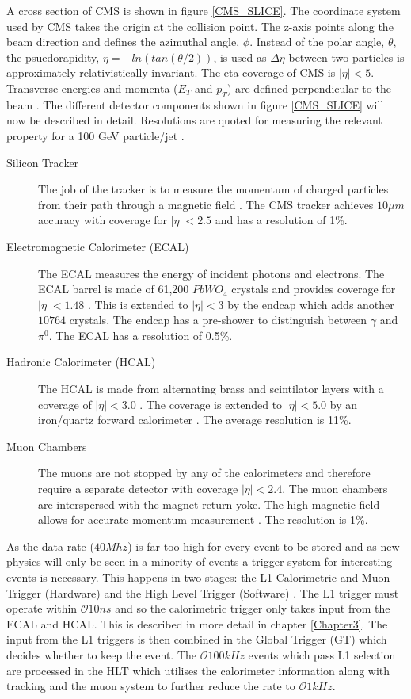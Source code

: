 A cross section of CMS is shown in figure \ref{CMS_SLICE}. The coordinate system used by CMS takes the origin at the collision point. The z-axis points along the beam direction and defines the azimuthal angle, $\phi$. Instead of the polar angle, $\theta$, the psuedorapidity, $\eta=-ln(tan(\theta/2))$, is used as $\Delta \eta$ between two particles is approximately relativistically invariant. The eta coverage of CMS is $|\eta|<5$. Transverse energies and momenta ($E_T $ and $p_T$)  are defined perpendicular to the beam \cite{cmsiop}. The different detector components shown in figure \ref{CMS_SLICE} will now be described in detail. Resolutions are quoted for measuring the relevant property for a 100 GeV particle/jet \cite{SACharacteristics}.
\begin{description}
\item[Silicon Tracker]The job of the tracker is to measure the momentum of charged particles from their path through a magnetic field \cite{siliconTDR}. The CMS tracker achieves $10\mu m$ accuracy with coverage for $|\eta|<2.5$ and has a resolution of 1\%.
\item[Electromagnetic Calorimeter (ECAL)] The ECAL measures the energy of incident photons and electrons. The ECAL barrel is made of 61,200 $PbWO_4$ crystals and provides coverage for $|\eta|<1.48$ \cite{ecal}. This is extended to $|\eta|<3$ by the endcap which adds another $10764$ crystals. The endcap has a pre-shower to distinguish between $\gamma$ and $\pi^0$. The ECAL has a resolution of 0.5\%.
 \item[Hadronic Calorimeter (HCAL)] The HCAL is made from alternating brass and scintilator layers with a coverage of $|\eta|<3.0$ \cite{hcal}. The coverage is extended to  $|\eta|<5.0$ by an iron/quartz forward calorimeter \cite{hfhcal}. The average resolution is 11\%. 
 \item[Muon Chambers]The muons are not stopped by any of the calorimeters and therefore require a separate detector with coverage $|\eta| < 2.4$. The muon chambers are interspersed with the magnet return yoke. The high magnetic field allows for accurate momentum measurement \cite{muons}. The resolution is 1\%.
\end{description}
As the data rate ($40Mhz$) is far too high for every event to be stored and as new physics will only be seen in a minority of events a trigger system for interesting events is necessary. This happens in two stages: the L1 
Calorimetric and Muon Trigger (Hardware) and the High Level Trigger (Software) \cite{HLT}. The L1 trigger must operate within $\mathcal{O}10ns$ and so  the calorimetric trigger only takes input from the ECAL and HCAL. This is described in more detail in chapter \ref{Chapter3}. The input from the L1 triggers is then combined in the Global Trigger (GT) which decides whether to keep the event. The $\mathcal{O}100kHz$ events which pass L1 selection are processed in the HLT which utilises the calorimeter information along with tracking and the muon system to further reduce the rate to $\mathcal{O}1kHz$.
